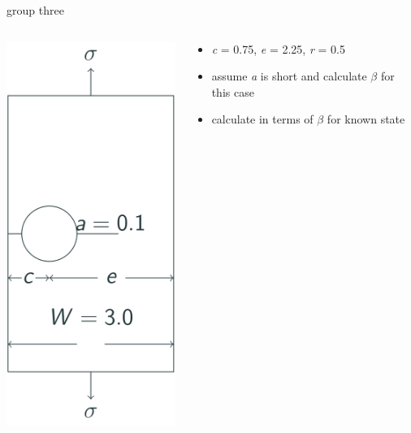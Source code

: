 \documentclass[
  letterpaper,
  ignorenonframetext,
  aspectratio=43,
  handout,
  12pt]{beamer}
\providecommand{\tightlist}{%
  \setlength{\itemsep}{0pt}\setlength{\parskip}{0pt}}
\providecommand{\tightlist}{%
\setlength{\itemsep}{0pt}\setlength{\parskip}{0pt}}
\let\Oldincludegraphics\includegraphics
\renewcommand{\includegraphics}[2][]{\Oldincludegraphics[width=\textwidth,height=0.7\textheight,keepaspectratio]{#2}}
\begin{document}
\begin{frame}{group three}
\protect\hypertarget{group-three}{}
\begin{columns}[T]
\begin{column}{0.5\textwidth}
\includegraphics{../images/curved-group3.svg}
\end{column}

\begin{column}{0.5\textwidth}
\begin{itemize}
\tightlist
\item
  \emph{c} = 0.75, \emph{e} = 2.25, \emph{r} = 0.5
\item
  assume \emph{a} is short and calculate \(\beta\) for this case
\item
  calculate in terms of \(\beta\) for known state
\end{itemize}
\end{column}
\end{columns}
\end{frame}
\end{document}
